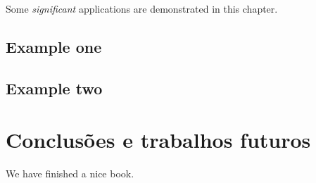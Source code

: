 \documentclass[]{book}
\begin{document}
Some \emph{significant} applications are demonstrated in this chapter.

\section{Example one}\label{example-one}

\section{Example two}\label{example-two}

\chapter{Conclusões e trabalhos
futuros}\label{conclusuxf5es-e-trabalhos-futuros}

We have finished a nice book.


\end{document}
